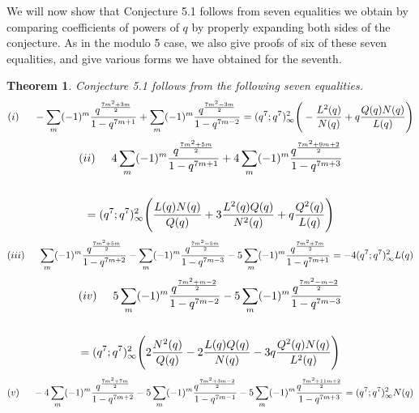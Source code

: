 \documentclass[10pt,reqno]{amsart}
\newtheorem{theorem}{Theorem}[section]
\begin{document}
We will now show that Conjecture 5.1 follows from seven equalities we obtain by comparing coefficients of powers of $q$ by properly expanding both sides of the conjecture. As in the modulo 5 case, we also give proofs of six of these seven equalities, and give various forms we have obtained for the seventh.
\begin{theorem}
Conjecture 5.1 follows from the following seven equalities. 
\begin{equation}
    (i)\hspace{0.5cm} -\displaystyle\sum_{m}(-1)^m\displaystyle\frac{q^{\frac{7m^2+3m}{2}}}{1-q^{7m+1}}+\displaystyle\sum_{m}(-1)^m\displaystyle\frac{q^{\frac{7m^2-3m}{2}}}{1-q^{7m-2}}=(q^7;q^7)_{\infty}^2\Bigg(-\displaystyle\frac{L^2(q)}{N(q)}+q\displaystyle\frac{Q(q)N(q)}{L(q)}\Bigg)
\end{equation}
\begin{multline}
    (ii)\hspace{0.5cm} 4\displaystyle\sum_{m}(-1)^m\displaystyle\frac{q^{\frac{7m^2+5m}{2}}}{1-q^{7m+1}}+4\displaystyle\sum_{m}(-1)^m\displaystyle\frac{q^{\frac{7m^2+9m+2}{2}}}{1-q^{7m+3}}\\ \\
    =(q^7;q^7)_{\infty}^2\Bigg(\displaystyle\frac{L(q)N(q)}{Q(q)}+3\displaystyle\frac{L^2(q)Q(q)}{N^2(q)}+q\displaystyle\frac{Q^2(q)}{L(q)}\Bigg)
\end{multline}
\begin{multline}
    (iii)\hspace{0.5cm} \displaystyle\sum_{m}(-1)^m\displaystyle\frac{q^{\frac{7m^2+5m}{2}}}{1-q^{7m+2}}-\displaystyle\sum_{m}(-1)^m\displaystyle\frac{q^{\frac{7m^2-5m}{2}}}{1-q^{7m-3}}-5\displaystyle\sum_{m}(-1)^m\displaystyle\frac{q^{\frac{7m^2+7m}{2}}}{1-q^{7m+1}}=-4(q^7;q^7)_{\infty}^2L(q)
\end{multline}
\begin{multline}
    (iv)\hspace{0.5cm} 5\displaystyle\sum_{m}(-1)^m\displaystyle\frac{q^{\frac{7m^2+m-2}{2}}}{1-q^{7m-2}}-5\displaystyle\sum_{m}(-1)^m\displaystyle\frac{q^{\frac{7m^2-m-2}{2}}}{1-q^{7m-3}}\\ \\
    =(q^7;q^7)_{\infty}^2\Bigg(2\displaystyle\frac{N^2(q)}{Q(q)}-2\displaystyle\frac{L(q)Q(q)}{N(q)}-3q\displaystyle\frac{Q^2(q)N(q)}{L^2(q)}\Bigg)
\end{multline}
\begin{multline}
    (v)\hspace{0.5cm} -4\displaystyle\sum_{m}(-1)^m\displaystyle\frac{q^{\frac{7m^2+7m}{2}}}{1-q^{7m+2}}-5\displaystyle\sum_{m}(-1)^m\displaystyle\frac{q^{\frac{7m^2+3m-2}{2}}}{1-q^{7m-1}}-5\displaystyle\sum_{m}(-1)^m\displaystyle\frac{q^{\frac{7m^2+11m+2}{2}}}{1-q^{7m+3}}=(q^7;q^7)_{\infty}^2N(q)

\end{multline}
\end{theorem}
\end{document}

